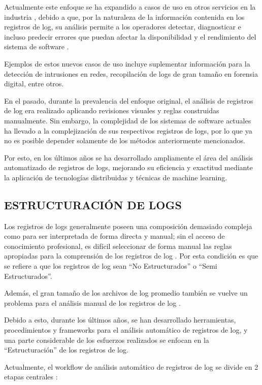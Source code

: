 Actualmente este enfoque se ha expandido a casos de uso en otros servicios en la industria \cite{ma2023automatic}, debido a que, por la naturaleza de la información contenida en los registros de log, su análisis permite a los operadores detectar, diagnosticar e incluso predecir errores que puedan afectar la disponibilidad y el rendimiento del sistema de software \cite{jayathilake2011mind}.

Ejemplos de estos nuevos casos de uso incluye suplementar información para la detección de intrusiones en redes, recopilación de logs de gran tamaño en forensia digital, entre otros. \cite{ma2023automatic}

En el pasado, durante la prevalencia del enfoque original, el análisis de registros de log era realizado aplicando revisiones visuales y reglas construidas manualmente. Sin embargo, la complejidad de los sistemas de software actuales ha llevado a la complejización de sus respectivos registros de logs, por lo que ya no es posible depender solamente de los métodos anteriormente mencionados. \cite{ma2023automatic}

Por esto, en los últimos años se ha desarrollado ampliamente el área del análisis automatizado de registros de logs, mejorando su eficiencia y exactitud mediante la aplicación de tecnologías distribuidas y técnicas de machine learning. \cite{ma2023automatic}

\subsection{ESTRUCTURACIÓN DE LOGS}
Los registros de logs generalmente poseen una composición demasiado compleja como para ser interpretada de forma directa y manual; sin el acceso de conocimiento profesional, es difícil seleccionar de forma manual las reglas apropiadas para la comprensión de los registros de log \cite{ma2023automatic}. Por esta condición es que se refiere a que los registros de log sean “No Estructurados” o “Semi Estructurados”. 

Además, el gran tamaño de los archivos de log promedio también se vuelve un problema para el análisis manual de los registros de log \cite{ma2023automatic}.

Debido a esto, durante los últimos años, se han desarrollado herramientas, procedimientos y frameworks para el análisis automático de registros de log, y una parte considerable de los esfuerzos realizados se enfocan en la “Estructuración” de los registros de log.

Actualmente, el workflow de análisis automático de registros de log se divide en 2 etapas centrales \cite{ma2023automatic}:

